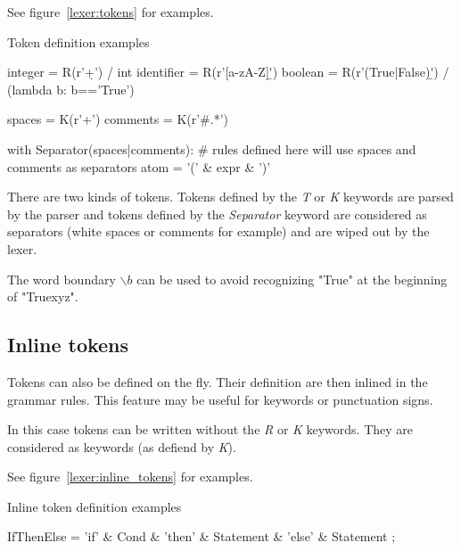 See figure~\ref{lexer:tokens} for examples.

\begin{code}
\caption{Token definition examples}                         \label{lexer:tokens}
\begin{verbatimtab}[4]
    integer = R(r'\d+') / int
    identifier = R(r'[a-zA-Z]\w*\b')
    boolean = R(r'(True|False)\b') / (lambda b: b=='True')

    spaces = K(r'\s+')
    comments = K(r'#.*')

    with Separator(spaces|comments):
        # rules defined here will use spaces and comments as separators
        atom = '(' & expr & ')'
\end{verbatimtab}
\end{code}

There are two kinds of tokens. Tokens defined by the \emph{T} or \emph{K} keywords are parsed by the parser and tokens defined by the \emph{Separator} keyword are considered as separators (white spaces or comments for example) and are wiped out by the lexer.

The word boundary \emph{$\backslash b$} can be used to avoid recognizing "True" at the beginning of "Truexyz".

\subsection{Inline tokens}

Tokens can also be defined on the fly. Their definition are then inlined in the grammar rules.
This feature may be useful for keywords or punctuation signs.

In this case tokens can be written without the \emph{R} or \emph{K} keywords. They are considered as keywords (as defiend by \emph{K}).

See figure~\ref{lexer:inline_tokens} for examples.

\begin{code}
\caption{Inline token definition examples}                  \label{lexer:inline_tokens}
\begin{verbatimtab}[4]
    IfThenElse = 'if' & Cond &
                 'then' & Statement &
                 'else' & Statement
        ;
\end{verbatimtab}
\end{code}

